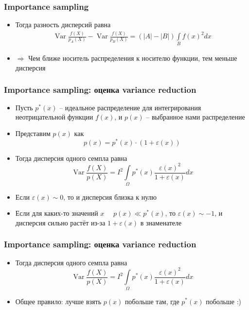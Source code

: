 \documentclass[10pt]{beamer}
\begin{document}
\begin{frame}
\frametitle{Importance sampling}
\begin{itemize}
\item Тогда разность дисперсий равна
\begin{gather*}
\operatorname{Var}\frac{f(X)}{p_A(X)} - \operatorname{Var}\frac{f(X)}{p_B(X)} = (|A| - |B|) \int\limits_B f(x)^2 dx
\end{gather*}
\pause
\item \begin{math}\Longrightarrow\end{math} Чем ближе носитель распределения к носителю функции, тем меньше дисперсия
\end{itemize}
\end{frame}

\begin{frame}
\frametitle{Importance sampling: оценка variance reduction}
\begin{itemize}
\item Пусть \(p^*(x)\) -- идеальное распределение для интегрирования неотрицательной функции \(f(x)\), и \(p(x)\) -- выбранное нами распределение
\pause
\item Представим \(p(x)\) как
\begin{equation*}
p(x) = p^*(x)\cdot (1+\varepsilon(x))
\end{equation*}
\pause
\item Тогда дисперсия одного семпла равна
\begin{equation*}
\operatorname{Var}\frac{f(X)}{p(X)} = I^2 \int\limits_\Omega p^*(x) \frac{\varepsilon(x)^2}{1+\varepsilon(x)}dx
\end{equation*}
\pause
\item Если \(\varepsilon(x) \sim 0\), то и дисперсия близка к нулю
\pause
\item Если для каких-то значений \(x\) \(\quad p(x) \ll p^*(x)\), то \(\varepsilon(x) \sim -1\), и дисперсия сильно растёт из-за \(1+\varepsilon(x)\) в знаменателе
\end{itemize}
\end{frame}

\begin{frame}
\frametitle{Importance sampling: оценка variance reduction}
\begin{itemize}
\item Тогда дисперсия одного семпла равна
\begin{equation*}
\operatorname{Var}\frac{f(X)}{p(X)} = I^2 \int\limits_\Omega p^*(x) \frac{\varepsilon(x)^2}{1+\varepsilon(x)}dx
\end{equation*}
\pause
\item Общее правило: лучше взять \(p(x)\) побольше там, где \(p^*(x)\) побольше :)
\end{itemize}
\end{frame}
\end{document}

